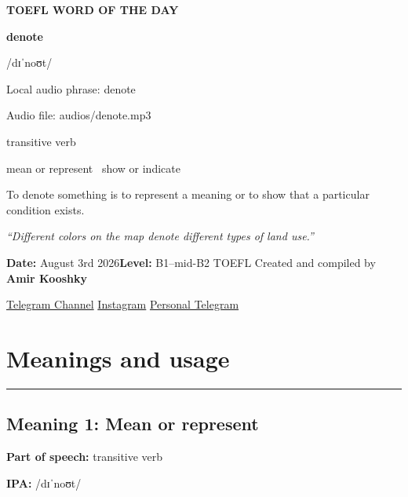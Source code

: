 \documentclass[11pt]{article}
\newcommand{\sectionrule}{\par\vspace{-0.5em}\noindent\textcolor{Accent}{\rule{\linewidth}{0.6pt}}\par}
\begin{document}
\begin{center}
{\sffamily\bfseries\color{Accent} TOEFL WORD OF THE DAY\par}
\vspace{8mm}
{\fontsize{42}{48}\selectfont\bfseries denote\par}
\vspace{2mm}
{\Large\sffamily\color{Accent} /dɪˈnoʊt/\par}
\vspace{2mm}
{\small\sffamily Local audio phrase: denote\par}
{\small\sffamily Audio file: audios/denote.mp3\par}
\vspace{2mm}
{\large\sffamily\color{Muted} transitive verb\par}
\vspace{5mm}
{\sffamily mean or represent \textbullet\ show or indicate\par}
\vspace{6mm}
{\large To denote something is to represent a meaning or to show that a particular condition exists.\par}
\vspace{6mm}
\begin{minipage}{0.84\textwidth}
\itshape “Different colors on the map denote different types of land use.”
\end{minipage}\par
\vspace{10mm}
\textbf{Date:} August 3rd 2026\quad\textbullet\quad \textbf{Level:} B1--mid-B2 TOEFL
\vfill
Created and compiled by \textbf{Amir Kooshky}\par
\vspace{2mm}
\href{https://t.me/KooshkyTOEFL}{Telegram Channel}\quad\textbullet\quad
\href{https://www.instagram.com/kooshkytoefl}{Instagram}\quad\textbullet\quad
\href{https://t.me/KooshkyTOEFL\_pv}{Personal Telegram}
\end{center}
\newpage
\tableofcontents
\newpage

\section{Meanings and usage}
\sectionrule
\subsection{Meaning 1: Mean or represent}
\textbf{Part of speech:} transitive verb

\textbf{IPA:} /dɪˈnoʊt/
\end{document}
